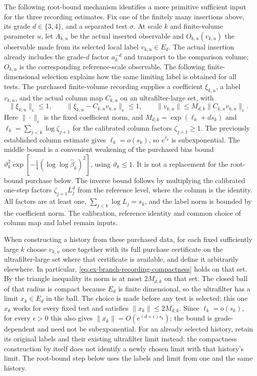 The following root-bound mechanism identifies a more primitive sufficient
input for the three recording estimates. Fix one of the finitely many
insertions above, its grade $d\in\{3,4\}$, and a separated test $\sigma$.
At scale $k$ and finite-volume parameter $u$, let $A_{k,u}$ be the actual
inserted observable and $O_{k,u}(v_{k,u})$ the observable made from its
selected local label $v_{k,u}\in E_d$. The actual insertion already includes
the grade-$d$ factor $a_k^{-d}$ and transport to the comparison volume;
$O_{k,u}$ is the corresponding reference-scale observable. The
following finite-dimensional selection explains how the same limiting label is obtained for all tests.
The purchased finite-volume recording supplies a coefficient
$\xi_{k,u}$, a label $v_{k,u}$, and the actual column map $C_{k,u}$ on an
ultrafilter-large set, with
\begin{equation}
 \|\xi_{k,u}\|_{\mathrm c}\le1,\qquad
 \|\xi_{k,u}-C_{k,u}v_{k,u}\|_{\mathrm c}\le1,
 \qquad
 \|v_{k,u}\|\le M_{d,k}\|C_{k,u}v_{k,u}\|_{\mathrm c}.
 \label{eq:ex-branch-recording-compactness}
\end{equation}
Here $\|\cdot\|_{\mathrm c}$ is the fixed coefficient norm, and
$M_{d,k}=\exp(\ell_k+ds_k)$ and
$\ell_k=\sum_{j<k}\log\zeta_{j+1}$ for the calibrated column factors
$\zeta_{j+1}\ge1$. The previously established column estimate gives
$\ell_k=o(s_k)$, so $e^{\ell_k}$ is subexponential. The middle bound
is a convenient weakening of the purchased bias bound
$\vartheta_k^2\exp[-\tfrac14(\log\log\widehat\beta_k)^2]$, using
$\vartheta_k\le1$. It is not a replacement for the root-bound purchase
below. The inverse bound follows by multiplying the calibrated one-step factors
$\zeta_{j+1}L_j^d$ from the reference level, where the column is the identity.
All factors are at least one, $\sum_{j<k}\log L_j=s_k$, and the label norm
is bounded by the coefficient norm. The calibration, reference identity
and common choice of column map and label remain inputs.

When constructing a history from these purchased data, for each fixed
sufficiently large $k$ choose $v_{k,u}$ once together with its full
purchase certificate on the ultrafilter-large set where that certificate
is available, and define it arbitrarily elsewhere. In particular,
\eqref{eq:ex-branch-recording-compactness} holds on that set. By the
triangle inequality its norm is at most
$2M_{d,k}$ on that set. The closed ball of that radius is compact because
$E_d$ is finite dimensional, so the ultrafilter has a limit $x_k\in E_d$
in the ball. The choice is made before any test is selected; this one
$x_k$ works for every fixed test and satisfies $\|x_k\|\le2M_{d,k}$.
Since $\ell_k=o(s_k)$, for every $\epsilon>0$ this also gives
$\|x_k\|=O(e^{(d+\epsilon)s_k})$; the bound is grade-dependent and need
not be subexponential. For an already selected history, retain its original labels and their
existing ultrafilter limit instead: the compactness construction by itself
does not identify a newly chosen limit with that history's limit. The
root-bound step below uses the labels and limit from one and the same
history.

